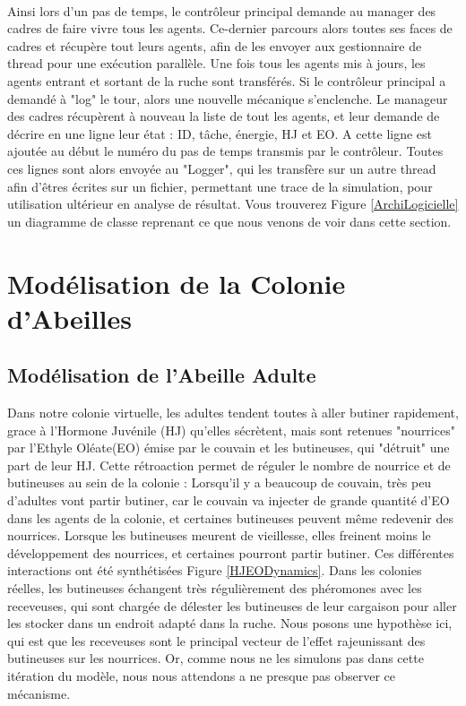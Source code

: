 			
			\paragraph{}
			Ainsi lors d'un pas de temps, le contrôleur principal demande au manager des cadres de faire vivre tous les agents. Ce-dernier parcours alors toutes ses faces de cadres et récupère tout leurs agents, afin de les envoyer aux gestionnaire de thread pour une exécution parallèle. Une fois tous les agents mis à jours, les agents entrant et sortant de la ruche sont transférés. Si le contrôleur principal a demandé à "log" le tour, alors une nouvelle mécanique s'enclenche. Le manageur des cadres récupèrent à nouveau la liste de tout les agents, et leur demande de décrire en une ligne leur état : ID, tâche, énergie, HJ et EO. A cette ligne est ajoutée au début le numéro du pas de temps transmis par le contrôleur. Toutes ces lignes sont alors envoyée au "Logger", qui les transfère sur un autre thread afin d'êtres écrites sur un fichier, permettant une trace de la simulation, pour utilisation ultérieur en analyse de résultat. Vous trouverez Figure \ref{ArchiLogicielle} un diagramme de classe reprenant ce que nous venons de voir dans cette section.

	\section{Modélisation de la Colonie d'Abeilles}
		\subsection{Modélisation de l'Abeille Adulte}
		
		Dans notre colonie virtuelle, les adultes tendent toutes à aller butiner rapidement, grace à l'Hormone Juvénile (HJ) qu'elles sécrètent, mais sont retenues "nourrices" par l'Ethyle Oléate(EO) émise par le couvain et les butineuses, qui "détruit" une part de leur HJ. Cette rétroaction permet de réguler le nombre de nourrice et de butineuses au sein de la colonie : Lorsqu'il y a beaucoup de couvain, très peu d'adultes vont partir butiner, car le couvain va injecter de grande quantité d'EO dans les agents de la colonie, et certaines butineuses peuvent même redevenir des nourrices. Lorsque les butineuses meurent de vieillesse, elles freinent moins le développement des nourrices, et certaines pourront partir butiner. Ces différentes interactions ont été synthétisées Figure \ref{HJEODynamics}. Dans les colonies réelles, les butineuses échangent très régulièrement des phéromones avec les receveuses, qui sont chargée de délester les butineuses de leur cargaison pour aller les stocker dans un endroit adapté dans la ruche. Nous posons une hypothèse ici, qui est que les receveuses sont le principal vecteur de l'effet rajeunissant des butineuses sur les nourrices. Or, comme nous ne les simulons pas dans cette itération du modèle, nous nous attendons a ne presque pas observer ce mécanisme.
		
